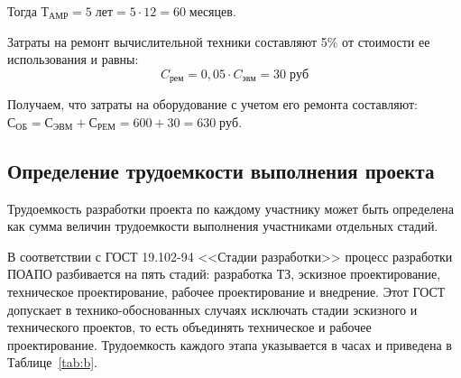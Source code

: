 Тогда $Т_{АМР} = 5 \; лет =5 \cdot 12 = 60 \; месяцев $.

Затраты на ремонт вычислительной техники составляют 5\% от  стоимости ее использования и равны:
$$C_{рем} = 0,05 \cdot C_{эвм} = 30 \; руб$$

Получаем, что  затраты на оборудование с учетом его ремонта составляют:
$ С_{ОБ} = С_{ЭВМ} + С_{РЕМ} =  600 + 30 = 630 \; руб$.

\subsection{Определение трудоемкости выполнения проекта}
Трудоемкость разработки проекта по каждому участнику может быть определена как сумма величин трудоемкости выполнения участниками отдельных стадий.

В соответствии с ГОСТ 19.102-94  <<Стадии разработки>> процесс разработки ПОАПО разбивается на пять стадий: разработка ТЗ, эскизное проектирование, техническое проектирование, рабочее проектирование и внедрение. Этот ГОСТ допускает в технико-обоснованных случаях исключать стадии эскизного и технического проектов, то есть объединять техническое и рабочее проектирование. Трудоемкость каждого этапа указывается в часах и приведена в  Таблице~\ref{tab:b}.

